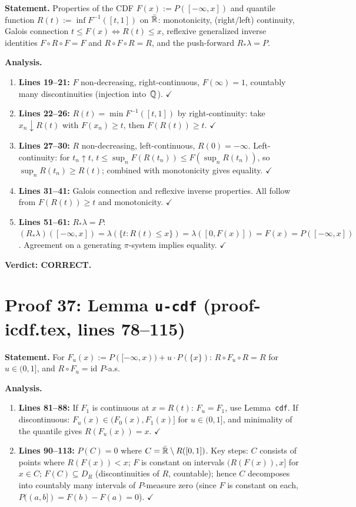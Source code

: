 \documentclass{article}
\begin{document}
\textbf{Statement.} Properties of the CDF $F(x):=P([-\infty,x])$ and quantile
function $R(t):=\inf F^{-1}([t,1])$ on $\bar{\mathbb{R}}$: monotonicity,
(right/left) continuity, Galois connection $t\le F(x)\iff R(t)\le x$,
reflexive generalized inverse identities $F\circ R\circ F=F$ and
$R\circ F\circ R=R$, and the push-forward $R_*\lambda=P$.

\textbf{Analysis.}
\begin{enumerate}[leftmargin=*]
  \item \textbf{Lines 19--21:} $F$ non-decreasing, right-continuous, $F(\infty)=1$,
    countably many discontinuities (injection into~$\mathbb{Q}$).  $\checkmark$
  \item \textbf{Lines 22--26:} $R(t)=\min F^{-1}([t,1])$ by right-continuity:
    take $x_n\downarrow R(t)$ with $F(x_n)\ge t$, then $F(R(t))\ge t$.  $\checkmark$
  \item \textbf{Lines 27--30:} $R$ non-decreasing, left-continuous, $R(0)=-\infty$.
    Left-continuity: for $t_n\uparrow t$, $t\le\sup_n F(R(t_n))\le F(\sup_n R(t_n))$,
    so $\sup_n R(t_n)\ge R(t)$; combined with monotonicity gives equality.  $\checkmark$
  \item \textbf{Lines 31--41:} Galois connection and reflexive inverse properties.
    All follow from $F(R(t))\ge t$ and monotonicity.  $\checkmark$
  \item \textbf{Lines 51--61:} $R_*\lambda=P$:
    $(R_*\lambda)([-\infty,x])=\lambda(\{t:R(t)\le x\})=\lambda([0,F(x)])=F(x)=P([-\infty,x])$.
    Agreement on a generating $\pi$-system implies equality.  $\checkmark$
\end{enumerate}

\textbf{Verdict: CORRECT.}

\section{Proof 37: Lemma \texttt{u-cdf} (proof-icdf.tex, lines 78--115)}

\textbf{Statement.} For $F_u(x):=P([-\infty,x))+u\cdot P(\{x\})$:
$R\circ F_u\circ R=R$ for $u\in(0,1]$, and $R\circ F_u=\mathrm{id}$ $P$-a.s.

\textbf{Analysis.}
\begin{enumerate}[leftmargin=*]
  \item \textbf{Lines 81--88:} If $F_1$ is continuous at $x=R(t)$: $F_u=F_1$, use
    Lemma~\texttt{cdf}.  If discontinuous: $F_u(x)\in(F_0(x),F_1(x)]$ for
    $u\in(0,1]$, and minimality of the quantile gives $R(F_u(x))=x$.  $\checkmark$
  \item \textbf{Lines 90--113:} $P(C)=0$ where $C=\bar{\mathbb{R}}\setminus R([0,1])$.
    Key steps: $C$ consists of points where $R(F(x))<x$;
    $F$ is constant on intervals $(R(F(x)),x]$ for $x\in C$;
    $F(C)\subseteq D_R$ (discontinuities of $R$, countable);
    hence $C$ decomposes into countably many intervals of $P$-measure zero
    (since $F$ is constant on each, $P((a,b])=F(b)-F(a)=0$).  $\checkmark$
\end{enumerate}
\end{document}
